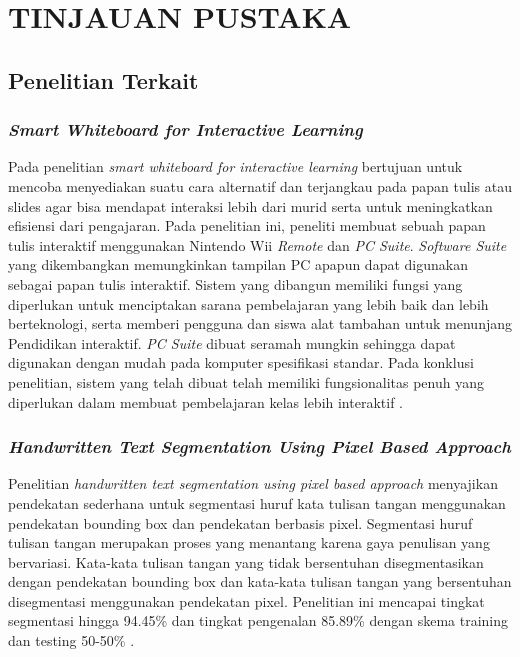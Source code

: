 \chapter{TINJAUAN PUSTAKA}
\label{chap:tinjauanpustaka}


\section{Penelitian Terkait}
\label{sec:penelitianterdahulu}

\subsection{\textit{Smart Whiteboard for Interactive Learning}}
\label{subsec:smartwbforinteractivelearning}
Pada penelitian \textit{smart whiteboard for interactive learning} bertujuan untuk mencoba menyediakan suatu cara alternatif dan terjangkau pada papan tulis atau slides agar bisa mendapat interaksi lebih dari murid serta untuk meningkatkan efisiensi dari pengajaran. Pada penelitian ini, peneliti membuat sebuah papan tulis interaktif menggunakan Nintendo Wii \textit{Remote} dan \textit{PC Suite}. \textit{Software Suite} yang dikembangkan memungkinkan tampilan PC apapun dapat digunakan sebagai papan tulis interaktif. Sistem yang dibangun memiliki fungsi yang diperlukan untuk menciptakan sarana pembelajaran yang lebih baik dan lebih berteknologi, serta memberi pengguna dan siswa alat tambahan untuk menunjang Pendidikan interaktif. \textit{PC Suite} dibuat seramah mungkin sehingga dapat digunakan dengan mudah pada komputer spesifikasi standar. Pada konklusi penelitian, sistem yang telah dibuat telah memiliki fungsionalitas penuh yang diperlukan dalam membuat pembelajaran kelas lebih interaktif \citep*{kellerman2018smart}.  \par

\subsection{\textit{Handwritten Text Segmentation Using Pixel Based Approach}}
\label{subsec:handwrittenpixelbasedapproach}
Penelitian \textit{handwritten text segmentation using pixel based approach} menyajikan pendekatan sederhana untuk segmentasi huruf kata tulisan tangan menggunakan pendekatan bounding box dan pendekatan berbasis pixel. Segmentasi huruf tulisan tangan merupakan proses yang menantang karena gaya penulisan yang bervariasi. Kata-kata tulisan tangan yang tidak bersentuhan disegmentasikan dengan pendekatan bounding box dan kata-kata tulisan tangan yang bersentuhan disegmentasi menggunakan pendekatan pixel. Penelitian ini mencapai tingkat segmentasi hingga 94.45\% dan tingkat pengenalan 85.89\% dengan skema training dan testing 50-50\% \citep*{arun2019handwritten}. \par

